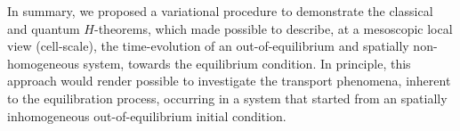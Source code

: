 In summary, we proposed a variational procedure to demonstrate the classical and
quantum $H$-theorems, which made possible to describe, at a mesoscopic local view
(cell-scale), the time-evolution of an out-of-equilibrium and spatially
non-homogeneous system, towards the equilibrium condition. In principle, this
approach would render possible to investigate the transport phenomena, inherent to the
equilibration process, occurring in a system that started from an spatially inhomogeneous
out-of-equilibrium initial condition. 


